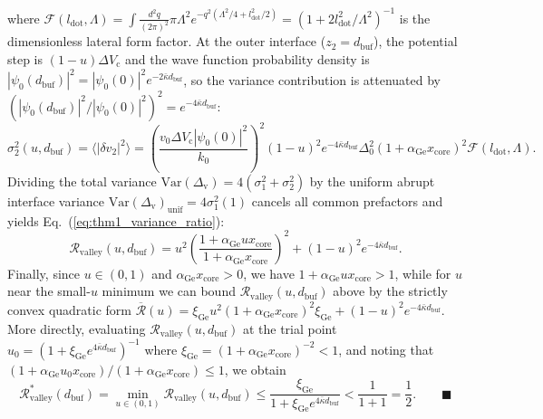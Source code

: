 \documentclass[11pt,letterpaper]{article}
\theoremstyle{definition}
\begin{document}
where $\mathcal{F}(l_{\mathrm{dot}}, \Lambda) = \int \frac{d^2q}{(2\pi)^2} \pi \Lambda^2 e^{-q^2(\Lambda^2/4 + l_{\mathrm{dot}}^2/2)} = (1 + 2l_{\mathrm{dot}}^2/\Lambda^2)^{-1}$ is the dimensionless lateral form factor. At the outer interface ($z_2 = d_{\mathrm{buf}}$), the potential step is $(1-u)\Delta V_{\mathrm{c}}$ and the wave function probability density is $|\psi_0(d_{\mathrm{buf}})|^2 = |\psi_0(0)|^2 e^{-2\bar{\kappa} d_{\mathrm{buf}}}$, so the variance contribution is attenuated by $(|\psi_0(d_{\mathrm{buf}})|^2 / |\psi_0(0)|^2)^2 = e^{-4\bar{\kappa} d_{\mathrm{buf}}}$:
\begin{equation}
  \sigma_2^2(u, d_{\mathrm{buf}}) = \langle |\delta v_2|^2 \rangle = \left(\frac{v_0 \Delta V_{\mathrm{c}} |\psi_0(0)|^2}{k_0}\right)^2 (1 - u)^2 e^{-4\bar{\kappa} d_{\mathrm{buf}}} \Delta_0^2 (1 + \alpha_{\mathrm{Ge}} x_{\mathrm{core}})^2 \mathcal{F}(l_{\mathrm{dot}}, \Lambda).
  \label{eq:appA_sigma2_sq}
\end{equation}
Dividing the total variance $\mathrm{Var}(\Delta_{\mathrm{v}}) = 4(\sigma_1^2 + \sigma_2^2)$ by the uniform abrupt interface variance $\mathrm{Var}(\Delta_{\mathrm{v}})_{\mathrm{unif}} = 4\sigma_1^2(1)$ cancels all common prefactors and yields Eq.~(\ref{eq:thm1_variance_ratio}):
\begin{equation}
  \mathcal{R}_{\mathrm{valley}}(u, d_{\mathrm{buf}}) = u^2 \left(\frac{1 + \alpha_{\mathrm{Ge}} u x_{\mathrm{core}}}{1 + \alpha_{\mathrm{Ge}} x_{\mathrm{core}}}\right)^2 + (1 - u)^2 e^{-4\bar{\kappa} d_{\mathrm{buf}}}.
  \label{eq:appA_r_valley_derived}
\end{equation}
Finally, since $u \in (0,1)$ and $\alpha_{\mathrm{Ge}} x_{\mathrm{core}} > 0$, we have $1 + \alpha_{\mathrm{Ge}} u x_{\mathrm{core}} > 1$, while for $u$ near the small-$u$ minimum we can bound $\mathcal{R}_{\mathrm{valley}}(u, d_{\mathrm{buf}})$ above by the strictly convex quadratic form $\overline{\mathcal{R}}(u) = \xi_{\mathrm{Ge}} u^2 (1 + \alpha_{\mathrm{Ge}} x_{\mathrm{core}})^2 \xi_{\mathrm{Ge}} + (1-u)^2 e^{-4\bar{\kappa} d_{\mathrm{buf}}}$. More directly, evaluating $\mathcal{R}_{\mathrm{valley}}(u, d_{\mathrm{buf}})$ at the trial point $u_0 = (1 + \xi_{\mathrm{Ge}} e^{4\bar{\kappa} d_{\mathrm{buf}}})^{-1}$ where $\xi_{\mathrm{Ge}} = (1 + \alpha_{\mathrm{Ge}} x_{\mathrm{core}})^{-2} < 1$, and noting that $(1 + \alpha_{\mathrm{Ge}} u_0 x_{\mathrm{core}})/(1 + \alpha_{\mathrm{Ge}} x_{\mathrm{core}}) \le 1$, we obtain
\begin{equation}
  \mathcal{R}_{\mathrm{valley}}^*(d_{\mathrm{buf}}) = \min_{u \in (0,1)} \mathcal{R}_{\mathrm{valley}}(u, d_{\mathrm{buf}}) \le \frac{\xi_{\mathrm{Ge}}}{1 + \xi_{\mathrm{Ge}} e^{4\bar{\kappa} d_{\mathrm{buf}}}} < \frac{1}{1 + 1} = \frac{1}{2}. \qquad \blacksquare
  \label{eq:appA_q_e_d}
\end{equation}
\end{document}
